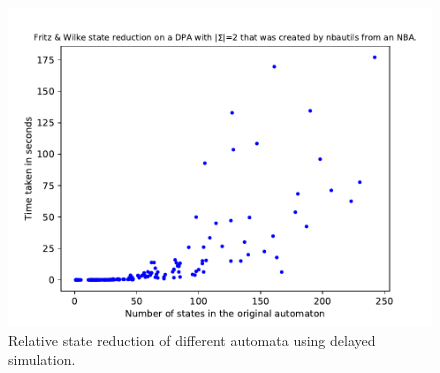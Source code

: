 \begin{figure}
\begin{minipage}{0.49\textwidth}
		\includegraphics[page=5,height=.3\textheight]{../data/analysis/fritzwilke/detnbaut_ap1.pdf} 
		\caption{Relative state reduction of different automata using delayed simulation.}
		\label{exp:fig:fritzwilke_reduct_prios}
	\end{minipage}
\end{figure}

